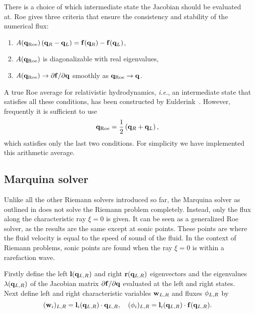\documentclass{article}
\begin{document}
There is a choice of which intermediate state the Jacobian should be
evaluated at. Roe gives three criteria that ensure the consistency and
stability of the numerical flux:
\begin{enumerate}
\item $A({\bf q}_{{\rm Roe}}) \left( {\bf q}_R - {\bf q}_L \right) =
  {\bf f}({\bf q}_R) - {\bf f}({\bf q}_L)$,
\item $A({\bf q}_{{\rm Roe}})$ is diagonalizable with real
  eigenvalues, 
\item $A({\bf q}_{{\rm Roe}}) \rightarrow \partial {\bf f} / \partial
  {\bf q}$ smoothly as ${\bf q}_{{\rm Roe}} \rightarrow {\bf q}$.
\end{enumerate}
\noindent A true Roe average for relativistic hydrodynamics, {\it i.e.}, an
intermediate state that satisfies all these conditions, has been
constructed by Eulderink~\cite{Eulderink94}. However, frequently it is sufficient
to use
\begin{equation}
  \label{roe3}
  {\bf q}_{{\rm Roe}} = \frac{1}{2} \left( {\bf q}_R + {\bf q}_L \right),
\end{equation}
\noindent which satisfies only the last two conditions. For simplicity
we have implemented this arithmetic average.


\subsection{Marquina solver}
\label{sec:marq}

Unlike all the other Riemann solvers introduced so far, the Marquina
solver as outlined in \cite{Marquina1} does not solve the Riemann
problem completely. Instead, only the flux along the characteristic
ray $\xi=0$ is given. It can be seen as a generalized Roe solver, as
the results are the same except at sonic points. These points are
where the fluid velocity is equal to the speed of sound of the fluid.
In the context of Riemann problems, sonic points are found when the
ray $\xi=0$ is within a rarefaction wave.

Firstly define the left ${\bf l}({\bf q}_{L,R})$ and right ${\bf
  r}({\bf q}_{L,R})$ eigenvectors and the eigenvalues $\lambda({\bf
  q}_{L,R})$ of the Jacobian matrix $\partial {\bf f} / \partial {\bf
  q}$ evaluated at the left and right states. Next define left and
right characteristic variables ${\bf w}_{L,R}$ and fluxes
${\bf \phi}_{L,R}$ by
\begin{equation}
  \label{marq1}
  ({\bf w}_i)_{L,R} = {\bf l}_i({\bf q}_{L,R}) \cdot {\bf q}_{L,R}, \quad
  ({\bf \phi}_i)_{L,R} = {\bf l}_i({\bf q}_{L,R}) \cdot {\bf f}({\bf
  q}_{L,R}). 
\end{equation}
\end{document}
